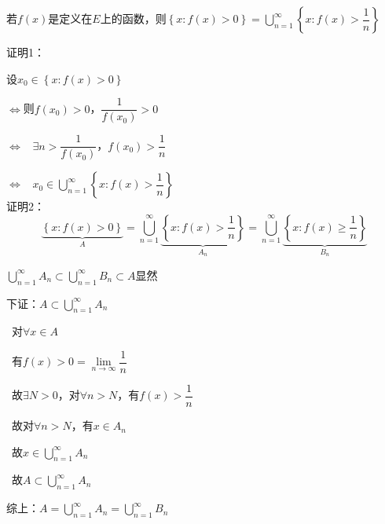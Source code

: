 \begin{eg}
    若$f(x)$是定义在$E$上的函数，则$\left\{x : f(x) > 0\right\} = \bigcup \limits_{n=1}^{\infty}\left\{x : f(x) > \dfrac{1}{n}\right\} $
\end{eg}
\noindent 证明1：
\par 设$x_{0} \in \left\{x : f(x) > 0\right\}$
\par $\Leftrightarrow$则$f(x_{0}) > 0$，$\dfrac{1}{f(x_{0})} > 0$
\par $\Leftrightarrow$ \ $\exists n > \dfrac{1}{f(x_{0})}$，$f(x_{0}) > \dfrac{1}{n}$
\par $\Leftrightarrow$ \ $x_{0} \in \bigcup \limits_{n=1}^{\infty}\left\{x : f(x) > \dfrac{1}{n}\right\} $
\\
证明2：
\[\underbrace{\left\{x : f(x) > 0\right\} }_\text{$A$}= \bigcup \limits_{n=1}^{\infty}\underbrace{\left\{x : f(x) > \dfrac{1}{n}\right\}}_\text{$A_{n}$} = \bigcup \limits_{n=1}^{\infty}\underbrace{\left\{x : f(x) \geqslant \dfrac{1}{n}\right\}}_\text{$B_{n}$} \]
\par {} $\bigcup \limits_{n=1}^{\infty} A_{n} \subset \bigcup \limits_{n=1}^{\infty} B_{n} \subset A$显然
\par {} 下证：$A \subset \bigcup \limits_{n=1}^{\infty} A_{n}$
\par \quad \ 对$\forall x \in A$
\par \quad \ 有$ f(x) > 0 = \lim \limits_{n \to \infty} \dfrac{1}{n} $
\par \quad \ 故$ \exists N > 0$，对$\forall n > N$，有$f(x) > \dfrac{1}{n}$
\par \quad \ 故对$\forall n > N$，有$x \in A_{n}$
\par \quad \ 故$ x \in \bigcup \limits_{n=1}^{\infty} A_{n}$
\par \quad \ 故$ A \subset \bigcup \limits_{n=1}^{\infty} A_{n}$
\par 综上：$A = \bigcup \limits_{n=1}^{\infty} A_{n} = \bigcup \limits_{n=1}^{\infty} B_{n} $

